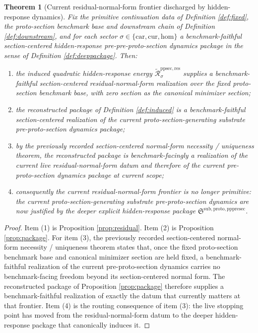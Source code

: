 \documentclass[11pt]{article}
\newcommand{\Car}{\mathrm{car}}
\newcommand{\Cur}{\mathrm{cur}}
\newcommand{\Hom}{\mathrm{hom}}
\newcommand{\PrePreProtoSectionPackage}{\mathfrak S^{\mathrm{sub,proto,pppresec}}}
\newcommand{\InducedResidualFunctional}[1]{\widetilde{\mathscr R}_{#1}^{\mathrm{ppsec,res}}}
\newtheorem{theorem}{Theorem}
\begin{document}
\begin{theorem}[Current residual-normal-form frontier discharged by hidden-response dynamics]
\label{thm:main}
Fix the primitive continuation data of Definition \ref{def:fixed}, the proto-section benchmark base and downstream chain of Definition \ref{def:downstream}, and for each sector \(\sigma\in\{\Car,\Cur,\Hom\}\) a benchmark-faithful section-centered hidden-response pre-pre-proto-section dynamics package in the sense of Definition \ref{def:deeppackage}. Then:
\begin{enumerate}
    \item the induced quadratic hidden-response energy \(\InducedResidualFunctional{\sigma}\) supplies a benchmark-faithful section-centered residual-normal-form realization over the fixed proto-section benchmark base, with zero section as the canonical minimizer section;
    \item the reconstructed package of Definition \ref{def:induced} is a benchmark-faithful section-centered realization of the current proto-section-generating substrate pre-proto-section dynamics package;
    \item by the previously recorded section-centered normal-form necessity / uniqueness theorem, the reconstructed package is benchmark-facingly a realization of the current live residual-normal-form datum and therefore of the current pre-proto-section dynamics package at current scope;
    \item consequently the current residual-normal-form frontier is no longer primitive: the current proto-section-generating substrate pre-proto-section dynamics are now justified by the deeper explicit hidden-response package \(\PrePreProtoSectionPackage\).
\end{enumerate}
\end{theorem}

\begin{proof}
Item (1) is Proposition \ref{prop:residual}. Item (2) is Proposition \ref{prop:package}. For item (3), the previously recorded section-centered normal-form necessity / uniqueness theorem states that, once the fixed proto-section benchmark base and canonical minimizer section are held fixed, a benchmark-faithful realization of the current pre-proto-section dynamics carries no benchmark-facing freedom beyond its section-centered normal form. The reconstructed package of Proposition \ref{prop:package} therefore supplies a benchmark-faithful realization of exactly the datum that currently matters at that frontier. Item (4) is the routing consequence of item (3): the live stopping point has moved from the residual-normal-form datum to the deeper hidden-response package that canonically induces it.
\end{proof}
\end{document}
